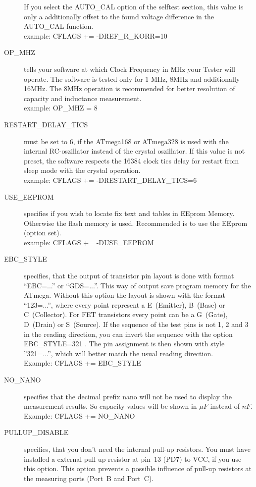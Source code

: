 \begin{description}
If you select the AUTO\_CAL option of the selftest section, this value is only a additionally offset to the found voltage 
difference in the AUTO\_CAL function.\\
example: CFLAGS += -DREF\_R\_KORR=10
  \item[OP\_MHZ] tells your software at which Clock Frequency in MHz your Tester will operate.
The software is tested only for 1 MHz, 8MHz and additionally 16MHz. 
The 8MHz operation is recommended for better resolution of capacity and inductance measurement.\\
example: OP\_MHZ = 8
  \item[RESTART\_DELAY\_TICS] must be set to 6, if the ATmega168 or ATmega328 is used with the internal RC-oszillator instead of
the crystal oszillator.
If this value is not preset, the software respects the 16384 clock tics delay for restart from sleep mode with the crystal operation.\\
example: CFLAGS += -DRESTART\_DELAY\_TICS=6
  \item[USE\_EEPROM] specifies if you wish to locate fix text and tables in EEprom Memory. Otherwise the flash memory is used.
Recommended is to use the EEprom (option set).\\
example: CFLAGS += -DUSE\_EEPROM
\item[EBC\_STYLE] specifies, that the output of transistor pin layout is done with format ``EBC=...'' or ``GDS=...''.
This way of output save program memory for the ATmega. Without this option the layout is shown with the
format ``123=...'', where every point represent a E~(Emitter), B~(Base) or C~(Collector).
For FET transistors every point can be a G~(Gate), D~(Drain) or S~(Source).
If the sequence of the test pins is not 1, 2 and 3 in the reading direction, you can invert the sequence with the option
EBC\_STYLE=321 . The pin assignment is then shown with style ''321=...'', which will better match the usual
reading direction.\\
Example: CFLAGS += EBC\_STYLE
  \item[NO\_NANO] specifies that the decimal prefix nano will not be used to display the measurement results.
So capacity values will be shown in \(\mu F\) instead of \(nF\).\\
Example: CFLAGS += NO\_NANO
\item[PULLUP\_DISABLE] specifies, that you don't need the internal pull-up resistors.
 You must have installed a external pull-up resistor at pin~13 (PD7) to VCC, if you use this option.
This option prevents a possible influence of pull-up resistors at the measuring ports (Port~B and Port~C).\\

\end{description}

